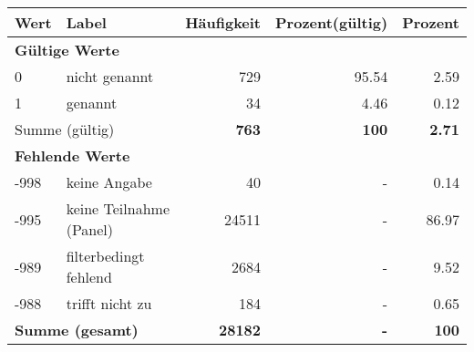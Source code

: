      \begin{longtable}{lXrrr}
     \toprule
     \textbf{Wert} & \textbf{Label} & \textbf{Häufigkeit} & \textbf{Prozent(gültig)} & \textbf{Prozent} \\
     \endhead
     \midrule
     \multicolumn{5}{l}{\textbf{Gültige Werte}}\\

     0 &
     \multicolumn{1}{X}{ nicht genannt   } &


       \num{729} &
       \num[round-mode=places,round-precision=2]{95.54} &
         \num[round-mode=places,round-precision=2]{2.59} \\

     1 &
     \multicolumn{1}{X}{ genannt   } &


       \num{34} &
       \num[round-mode=places,round-precision=2]{4.46} &
         \num[round-mode=places,round-precision=2]{0.12} \\
     \midrule
     \multicolumn{2}{l}{Summe (gültig)} &
       \textbf{\num{763}} &
     \textbf{100} &
       \textbf{\num[round-mode=places,round-precision=2]{2.71}} \\
     \multicolumn{5}{l}{\textbf{Fehlende Werte}}\\
       -998 &
       keine Angabe &
         \num{40} &
        - &
         \num[round-mode=places,round-precision=2]{0.14} \\
       -995 &
       keine Teilnahme (Panel) &
         \num{24511} &
        - &
         \num[round-mode=places,round-precision=2]{86.97} \\
       -989 &
       filterbedingt fehlend &
         \num{2684} &
        - &
         \num[round-mode=places,round-precision=2]{9.52} \\
       -988 &
       trifft nicht zu &
         \num{184} &
        - &
         \num[round-mode=places,round-precision=2]{0.65} \\
     \midrule
     \multicolumn{2}{l}{\textbf{Summe (gesamt)}} &
          \textbf{\num{28182}} &
        \textbf{-} &
        \textbf{100} \\
     \bottomrule
     \end{longtable}
     

